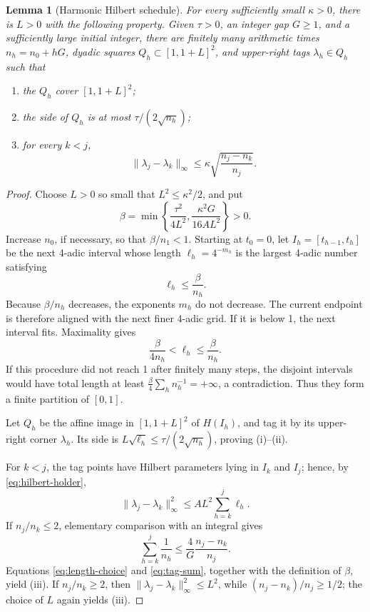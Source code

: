 \documentclass[11pt]{article}
\newtheorem{lemma}[theorem]{Lemma}
\begin{document}
\begin{lemma}[Harmonic Hilbert schedule]\label{lem:schedule}
For every sufficiently small \(\kappa>0\), there is \(L>0\) with the
following property.  Given \(\tau>0\), an integer gap \(G\geq1\), and a
sufficiently large initial integer, there are finitely many arithmetic times
\(n_h=n_0+hG\), dyadic squares \(Q_h\subset[1,1+L]^2\), and upper-right tags
\(\lambda_h\in Q_h\) such that
\begin{enumerate}[label=(\roman*)]
\item the \(Q_h\) cover \([1,1+L]^2\);
\item the side of \(Q_h\) is at most \(\tau/(2\sqrt{n_h})\);
\item for every \(k<j\),
\[
 \|\lambda_j-\lambda_k\|_\infty
 \leq\kappa\sqrt{\frac{n_j-n_k}{n_j}}.
\]
\end{enumerate}
\end{lemma}

\begin{proof}
Choose \(L>0\) so small that \(L^2\leq\kappa^2/2\), and put
\[
 \beta=\min\left\{
 \frac{\tau^2}{4L^2},
 \frac{\kappa^2G}{16AL^2}
 \right\}>0.
\]
Increase \(n_0\), if necessary, so that \(\beta/n_1<1\).  Starting at
\(t_0=0\), let \(I_h=[t_{h-1},t_h]\) be the next 4-adic interval whose length
\(\ell_h=4^{-m_h}\) is the largest 4-adic number satisfying
\begin{equation}
 \ell_h\leq\frac{\beta}{n_h}.
 \label{eq:length-choice}
\end{equation}
Because \(\beta/n_h\) decreases, the exponents \(m_h\) do not decrease.
The current endpoint is therefore aligned with the next finer 4-adic grid.
If it is below 1, the next interval fits.  Maximality gives
\begin{equation}
 \frac{\beta}{4n_h}<\ell_h\leq\frac{\beta}{n_h}.
 \label{eq:length-two-sided}
\end{equation}
If this procedure did not reach 1 after finitely many steps, the disjoint
intervals would have total length at least
\(\frac\beta4\sum_hn_h^{-1}=+\infty\), a contradiction.  Thus they form a
finite partition of \([0,1]\).

Let \(Q_h\) be the affine image in \([1,1+L]^2\) of \(H(I_h)\), and tag it
by its upper-right corner \(\lambda_h\).  Its side is
\(L\sqrt{\ell_h}\leq\tau/(2\sqrt{n_h})\), proving (i)--(ii).

For \(k<j\), the tag points have Hilbert parameters lying in \(I_k\) and
\(I_j\); hence, by \eqref{eq:hilbert-holder},
\begin{equation}
 \|\lambda_j-\lambda_k\|_\infty^2
 \leq AL^2\sum_{h=k}^j\ell_h.
 \label{eq:tag-sum}
\end{equation}
If \(n_j/n_k\leq2\), elementary comparison with an integral gives
\[
 \sum_{h=k}^j\frac1{n_h}
 \leq\frac4G\frac{n_j-n_k}{n_j}.
\]
Equations \eqref{eq:length-choice} and \eqref{eq:tag-sum}, together with the
definition of \(\beta\), yield (iii).  If \(n_j/n_k\geq2\), then
\(\|\lambda_j-\lambda_k\|_\infty^2\leq L^2\), while
\((n_j-n_k)/n_j\geq1/2\); the choice of \(L\) again yields (iii).
\end{proof}
\end{document}
